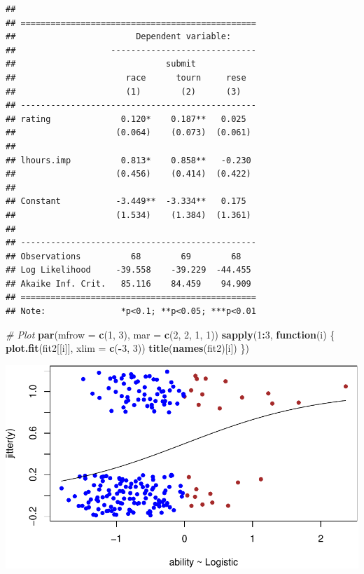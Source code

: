 \documentclass[]{article}
\newenvironment{Shaded}{\begin{snugshade}}{\end{snugshade}}
\newcommand{\KeywordTok}[1]{\textcolor[rgb]{0.13,0.29,0.53}{\textbf{#1}}}
\newcommand{\DataTypeTok}[1]{\textcolor[rgb]{0.13,0.29,0.53}{#1}}
\newcommand{\DecValTok}[1]{\textcolor[rgb]{0.00,0.00,0.81}{#1}}
\newcommand{\CommentTok}[1]{\textcolor[rgb]{0.56,0.35,0.01}{\textit{#1}}}
\newcommand{\ControlFlowTok}[1]{\textcolor[rgb]{0.13,0.29,0.53}{\textbf{#1}}}
\newcommand{\OperatorTok}[1]{\textcolor[rgb]{0.81,0.36,0.00}{\textbf{#1}}}
\newcommand{\NormalTok}[1]{#1}
\let\oldShaded\Shaded
\let\endoldShaded\endShaded
\renewenvironment{Shaded}{\footnotesize\oldShaded}{\endoldShaded}
\begin{document}
\begin{verbatim}
## 
## ===============================================
##                        Dependent variable:     
##                   -----------------------------
##                              submit            
##                      race      tourn     rese  
##                      (1)        (2)      (3)   
## -----------------------------------------------
## rating              0.120*    0.187**   0.025  
##                    (0.064)    (0.073)  (0.061) 
##                                                
## lhours.imp          0.813*    0.858**   -0.230 
##                    (0.456)    (0.414)  (0.422) 
##                                                
## Constant           -3.449**  -3.334**   0.175  
##                    (1.534)    (1.384)  (1.361) 
##                                                
## -----------------------------------------------
## Observations          68        69        68   
## Log Likelihood     -39.558    -39.229  -44.455 
## Akaike Inf. Crit.   85.116    84.459    94.909 
## ===============================================
## Note:               *p<0.1; **p<0.05; ***p<0.01
\end{verbatim}

\begin{Shaded}
\begin{Highlighting}[]
\CommentTok{# Plot}
\KeywordTok{par}\NormalTok{(}\DataTypeTok{mfrow =} \KeywordTok{c}\NormalTok{(}\DecValTok{1}\NormalTok{, }\DecValTok{3}\NormalTok{), }\DataTypeTok{mar =} \KeywordTok{c}\NormalTok{(}\DecValTok{2}\NormalTok{, }\DecValTok{2}\NormalTok{, }\DecValTok{1}\NormalTok{, }\DecValTok{1}\NormalTok{))}
\KeywordTok{sapply}\NormalTok{(}\DecValTok{1}\OperatorTok{:}\DecValTok{3}\NormalTok{, }\ControlFlowTok{function}\NormalTok{(i) \{}
    \KeywordTok{plot.fit}\NormalTok{(fit2[[i]], }\DataTypeTok{xlim =} \KeywordTok{c}\NormalTok{(}\OperatorTok{-}\DecValTok{3}\NormalTok{, }\DecValTok{3}\NormalTok{))}
    \KeywordTok{title}\NormalTok{(}\KeywordTok{names}\NormalTok{(fit2)[i])}
\NormalTok{\})}
\end{Highlighting}
\end{Shaded}

\includegraphics{Figures/unnamed-chunk-8-1.pdf}
\end{document}
